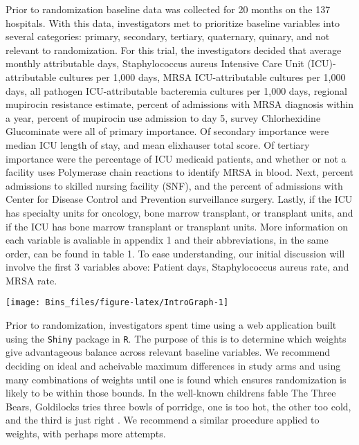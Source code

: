 \documentclass[]{sagej}
\begin{document}
Prior to randomization baseline data was collected for 20 months on the
137 hospitals. With this data, investigators met to prioritize baseline
variables into several categories: primary, secondary, tertiary,
quaternary, quinary, and not relevant to randomization. For this trial,
the investigators decided that average monthly attributable days,
Staphylococcus aureus Intensive Care Unit (ICU)-attributable cultures
per 1,000 days, MRSA ICU-attributable cultures per 1,000 days, all
pathogen ICU-attributable bacteremia cultures per 1,000 days, regional
mupirocin resistance estimate, percent of admissions with MRSA diagnosis
within a year, percent of mupirocin use admission to day 5, survey
Chlorhexidine Glucominate were all of primary importance. Of secondary
importance were median ICU length of stay, and mean elixhauser total
score. Of tertiary importance were the percentage of ICU medicaid
patients, and whether or not a facility uses Polymerase chain reactions
to identify MRSA in blood. Next, percent admissions to skilled nursing
facility (SNF), and the percent of admissions with Center for Disease
Control and Prevention surveillance surgery. Lastly, if the ICU has
specialty units for oncology, bone marrow transplant, or transplant
units, and if the ICU has bone marrow transplant or transplant units.
More information on each variable is avaliable in appendix 1 and their
abbreviations, in the same order, can be found in table 1. To ease
understanding, our initial discussion will involve the first 3 variables
above: Patient days, Staphylococcus aureus rate, and MRSA rate.

\begin{center}\texttt{[image: Bins\_files/figure-latex/IntroGraph-1]} \end{center}

Prior to randomization, investigators spent time using a web application
built using the \texttt{Shiny} package in \texttt{R}. The purpose of
this is to determine which weights give advantageous balance across
relevant baseline variables. We recommend deciding on ideal and
acheivable maximum differences in study arms and using many combinations
of weights until one is found which ensures randomization is likely to
be within those bounds. In the well-known childrens fable The Three
Bears, Goldilocks tries three bowls of porridge, one is too hot, the
other too cold, and the third is just right \citep{3Bears}. We recommend
a similar procedure applied to weights, with perhaps more attempts.
\end{document}
